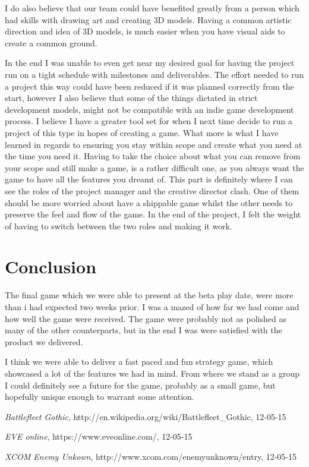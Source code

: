 \documentclass[a4paper,11pt]{article}
\begin{document}
I do also believe that our team could have benefited greatly from a person which had skills with drawing art and creating 3D models. Having a common artistic direction and idea of 3D models, is much easier when you have visual aids to create a common ground. 

In the end I was unable to even get near my desired goal for having the project run on a tight schedule with milestones and deliverables. The effort needed to run a project this way could have been reduced if it was planned correctly from the start, however I also believe that some of the things dictated in strict development models, might not be compatible with an indie game development process. I believe I have a greater tool set for when I next time decide to run a project of this type in hopes of creating a game. 
What more is what I have learned in regards to ensuring you stay within scope and create what you need at the time you need it. Having to take the choice about what you can remove from your scope and still make a game, is a rather difficult one, as you always want the game to have all the features you dreamt of. This part is definitely where I can see the roles of the project manager and the creative director clash. One of them should be more worried about have a shippable game whilst the other needs to preserve the feel and flow of the game. In the end of the project, I felt the weight of having to switch between the two roles and making it work. 

\section{Conclusion}
The final game which we were able to present at the beta play date, were more than i had expected two weeks prior. I was a mazed of how far we had come and how well the game were received. The game were probably not as polished as many of the other counterparts, but in the end I was were satisfied with the product we delivered. 

I think we were able to deliver a fast paced and fun strategy game, which showcased a lot of the features we had in mind. From where we stand as a group I could definitely see a future for the game, probably as a small game, but hopefully unique enough to warrant some attention. 
\appendix
\begin{thebibliography}{9}

  \emph{Battlefleet Gothic},
  http://en.wikipedia.org/wiki/Battlefleet\_Gothic,
  12-05-15
  
  \emph{EVE online},
  https://www.eveonline.com/,
  12-05-15

  \emph{XCOM Enemy Unkown},
  http://www.xcom.com/enemyunknown/entry,
  12-05-15 
\end{thebibliography}
\end{document}
